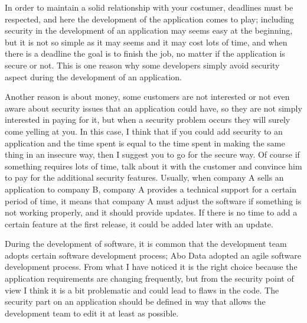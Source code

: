 In order to maintain a solid relationship with your costumer, deadlines must be respected, and here the development of the application comes to play; including security in the development of an application may seems easy at the beginning, but it is not so simple as it may seems and it may cost lots of time, and when there is a deadline the goal is to finish the job, no matter if the application is secure or not.\newline
This is one reason why some developers simply avoid security aspect during the development of an application.\newline

Another reason is about money, some customers are not interested or not even aware about security issues that an application could have, so they are not simply interested in paying for it, but when a security problem occurs they will surely come yelling at you.\newline
In this case, I think that if you could add security to an application and the time spent is equal to the time spent in making the same thing in an insecure way, then I suggest you to go for the secure way.\newline
Of course if something requires lots of time, talk about it with the customer and convince him to pay for the additional security features.\newline
Usually, when company A sells an application to company B, company A provides a technical support for a certain period of time, it means that company A must adjust the software if something is not working properly, and it should provide updates.
If there is no time to add a certain feature at the first release, it could be added later with an update.\newline

During the development of software, it is common that the development team adopts certain software development process; Abo Data adopted an agile software development process.\newline
From what I have noticed it is the right choice because the application requirements are changing frequently, but from the security point of view I think it is a bit problematic and could lead to flaws in the code.\newline
The security part on an application should be defined in way that allows the development team to edit it at least as possible.\newline

